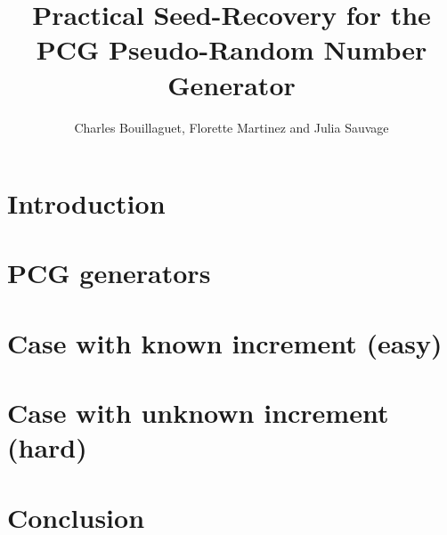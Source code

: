 \documentclass[11pt]{beamer}
\title[Seed-Recovery for PCG]{Practical Seed-Recovery for the \\ PCG Pseudo-Random Number Generator}
\author[Bouillaguet, Martinez, Sauvage]{
Charles Bouillaguet, Florette Martinez and \alert{Julia Sauvage}}
\begin{document}


\section{Introduction}



\section{PCG generators}



\section{Case with known increment (easy)}


\section{Case with unknown increment (hard)}


\section{Conclusion}

\end{document}
